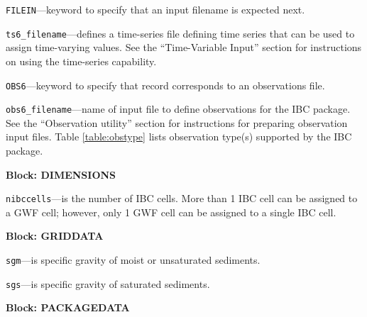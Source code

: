 \begin{description}
\item \texttt{FILEIN}---keyword to specify that an input filename is expected next.

\item \texttt{ts6\_filename}---defines a time-series file defining time series that can be used to assign time-varying values. See the ``Time-Variable Input'' section for instructions on using the time-series capability.

\item \texttt{OBS6}---keyword to specify that record corresponds to an observations file.

\item \texttt{obs6\_filename}---name of input file to define observations for the IBC package. See the ``Observation utility'' section for instructions for preparing observation input files. Table \ref{table:obstype} lists observation type(s) supported by the IBC package.

\end{description}
\item \textbf{Block: DIMENSIONS}

\begin{description}
\item \texttt{nibccells}---is the number of IBC cells.  More than 1 IBC cell can be assigned to a GWF cell; however, only 1 GWF cell can be assigned to a single IBC cell.

\end{description}
\item \textbf{Block: GRIDDATA}

\begin{description}
\item \texttt{sgm}---is specific gravity of moist or unsaturated sediments.

\item \texttt{sgs}---is specific gravity of saturated sediments.

\end{description}
\item \textbf{Block: PACKAGEDATA}

